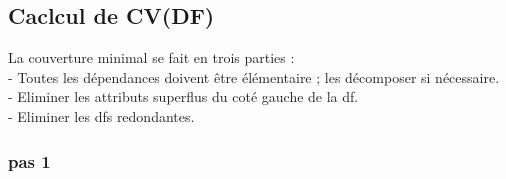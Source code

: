 \documentclass[a4paper,sffamily,12pt]{article}
\begin{document}
		\subsection{Caclcul de CV(DF)}

			\vspace{0.5cm}

			\noindent La couverture minimal se fait en trois parties : \\
				- Toutes les dépendances doivent être élémentaire ; les décomposer si nécessaire. \\
				- Eliminer les attributs superflus du coté gauche de la df. \\
				- Eliminer les dfs redondantes.
			
			\vspace{0.5cm}
				
			\subsubsection{pas 1}

				\vspace{0.5cm}
\end{document}
